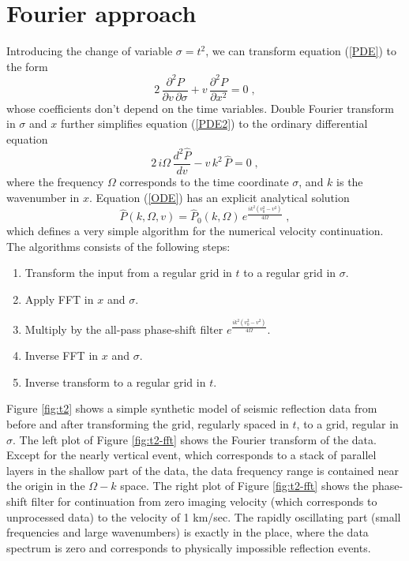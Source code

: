 \section{Fourier approach}


\par
Introducing the change of variable $\sigma = t^2$, we can transform
equation (\ref{PDE}) to the form
\begin{equation}
  2\,\frac{\partial^2 P}{\partial v\, \partial \sigma} +
  v\,\frac{\partial^2 P}{\partial x^2} = 0\;,
  \label{PDE2}
\end{equation}
whose coefficients don't depend on the time variables.  Double Fourier
transform in $\sigma$ and $x$ further simplifies equation (\ref{PDE2})
to the ordinary differential equation
\begin{equation}
  \label{ODE}
  2\,i\Omega\,\frac{d^2 \hat{P}}{d v} -
  v\,k^2\,\hat{P} = 0\;,
\end{equation}
where the frequency $\Omega$ corresponds to the time coordinate
$\sigma$, and $k$ is the wavenumber in $x$. Equation (\ref{ODE}) has
an explicit analytical solution
\begin{equation}
  \label{ODEsol}
  \hat{P} (k,\Omega,v) = \hat{P}_0 (k,\Omega)\,
  e^{\frac{i k^2(v_0^2-v^2)}{4\Omega}}\;,
\end{equation}
which defines a very simple algorithm for the numerical velocity
continuation. The algorithms consists of the following steps:
\begin{enumerate}
\item Transform the input from a regular grid in $t$ to a regular grid
  in $\sigma$.
\item Apply FFT in $x$ and $\sigma$.
\item Multiply by the all-pass phase-shift filter $e^{\frac{i
      k^2(v_0^2-v^2)}{4\Omega}}$.
\item Inverse FFT in $x$ and $\sigma$.
\item Inverse transform to a regular grid in $t$.
\end{enumerate}


Figure \ref{fig:t2} shows a simple synthetic model of seismic
reflection data from \cite[]{Claerbout.bei.95} before and after
transforming the grid, regularly spaced in $t$, to a grid, regular in
$\sigma$. The left plot of Figure \ref{fig:t2-fft} shows the Fourier
transform of the data. Except for the nearly vertical event, which
corresponds to a stack of parallel layers in the shallow part of the
data, the data frequency range is contained near the origin in the
$\Omega-k$ space.  The right plot of Figure \ref{fig:t2-fft} shows the
phase-shift filter for continuation from zero imaging velocity (which
corresponds to unprocessed data) to the velocity of 1 km/sec. The
rapidly oscillating part (small frequencies and large wavenumbers) is
exactly in the place, where the data spectrum is zero and corresponds
to physically impossible reflection events.

